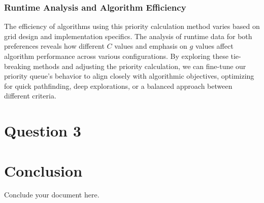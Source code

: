 \documentclass{article}
\begin{document}
\subsubsection{Runtime Analysis and Algorithm Efficiency}
The efficiency of algorithms using this priority calculation method varies based on grid design and implementation specifics. The analysis of runtime data for both preferences reveals how different \(C\) values and emphasis on \(g\) values affect algorithm performance across various configurations. By exploring these tie-breaking methods and adjusting the priority calculation, we can fine-tune our priority queue's behavior to align closely with algorithmic objectives, optimizing for quick pathfinding, deep explorations, or a balanced approach between different criteria.



\section{Question 3}
\section{Conclusion}
Conclude your document here.
\end{document}
